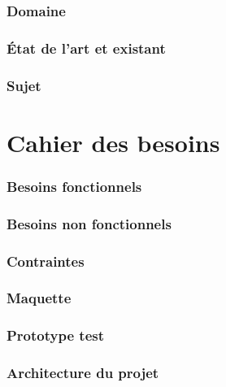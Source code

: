 \documentclass[paper=a4, fontsize=11pt]{article}
\newenvironment{changemargin}[2]{\begin{list}{}{%
\setlength{\topsep}{0pt}%
\setlength{\leftmargin}{0pt}%
\setlength{\rightmargin}{0pt}%
\setlength{\listparindent}{\parindent}%
\setlength{\itemindent}{\parindent}%
\setlength{\parsep}{0pt plus 1pt}%
\addtolength{\leftmargin}{#1}%
\addtolength{\rightmargin}{#2}%
}\item }{\end{list}}
\numberwithin{equation}{section}		%
\numberwithin{figure}{section}			%
\numberwithin{table}{section}				%
\begin{document}
\begin{changemargin}{-1cm}{-1cm}

\section{Domaine}


\section{État de l'art et existant}


\section{Sujet}


\part*{Cahier des besoins}
\section{Besoins fonctionnels}

\section{Besoins non fonctionnels}

\section{Contraintes}

%
\section{Maquette}

\section{Prototype test}\label{sec:prototypetest}

\section{Architecture du projet}\label{sec:archi}



\end{changemargin}
\end{document}
